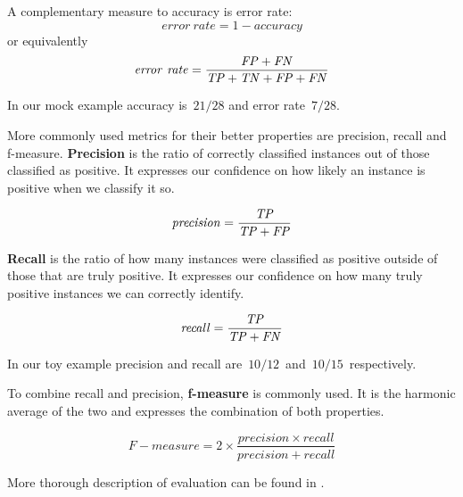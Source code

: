 A complementary measure to accuracy is error rate:
\begin{equation}
\mathit{error~rate} = 1 - \mathit{accuracy}
\end{equation}
or equivalently
\begin{equation}
\mathit{error~rate} = \frac{\mathit{FP} + \mathit{FN}}{\mathit{TP} + \mathit{TN} + \mathit{FP} + \mathit{FN}}
\end{equation}

In our mock example accuracy is~$21/28$ and error rate~$7/28$.

More commonly used metrics for their better properties are precision, recall and f-measure.
{\bf Precision} is the ratio of correctly classified instances out of those classified as positive.
It expresses our confidence on how likely an instance is positive when we classify it so.

\begin{equation}
\mathit{precision} = \frac{\mathit{TP}}{\mathit{TP} + \mathit{FP}}
\end{equation}

{\bf Recall} is the ratio of how many instances were classified as positive
outside of those that are truly positive.
It expresses our confidence on how many truly positive instances we can correctly identify.

\begin{equation}
\mathit{recall} = \frac{\mathit{TP}}{\mathit{TP} + \mathit{FN}}
\end{equation}

In our toy example precision and recall are~$10/12$~and~$10/15$~respectively.

To combine recall and precision, {\bf f-measure} is commonly used.
It is the harmonic average of the two and expresses the combination of both properties.

\begin{equation}
	\mathit{F-measure} = 2 \times \frac{\mathit{precision}\times \mathit{recall}}{\mathit{precision} + \mathit{recall}}
\end{equation}


More thorough description of evaluation can be found in \citet{TanBachKum08}.




